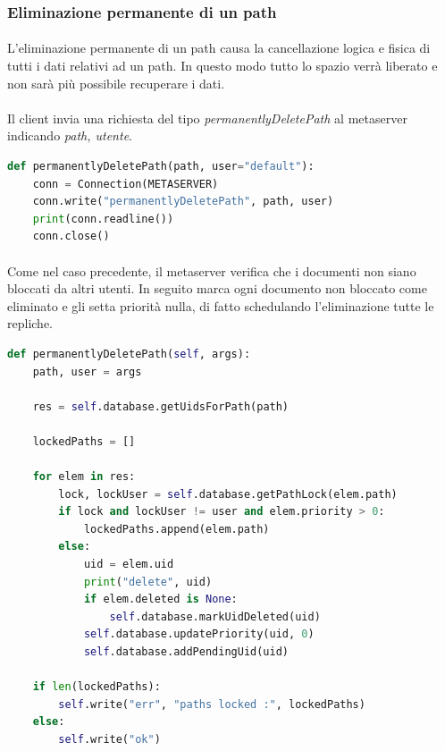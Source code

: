 \documentclass{article}
\begin{document}
\subsubsection{Eliminazione permanente di un path}

\paragraph{} L'eliminazione permanente di un path causa la cancellazione logica e fisica di tutti i dati relativi ad un path. In questo modo tutto lo spazio verrà liberato e non sarà più possibile recuperare i dati. 

\paragraph{} Il client invia una richiesta del tipo \emph{permanentlyDeletePath} al metaserver indicando \emph{path, utente}.

\begin{lstlisting}[language=Python, title=Codice]
def permanentlyDeletePath(path, user="default"):
    conn = Connection(METASERVER)
    conn.write("permanentlyDeletePath", path, user)
    print(conn.readline())
    conn.close()
\end{lstlisting}

\paragraph{} Come nel caso precedente, il metaserver verifica che i documenti non siano bloccati da altri utenti. In seguito marca ogni documento non bloccato come eliminato e gli setta priorità nulla, di fatto schedulando l'eliminazione tutte le repliche.

\begin{lstlisting}[language=Python, title=Codice]
def permanentlyDeletePath(self, args):
    path, user = args

    res = self.database.getUidsForPath(path)

    lockedPaths = []

    for elem in res:
        lock, lockUser = self.database.getPathLock(elem.path)
        if lock and lockUser != user and elem.priority > 0:
            lockedPaths.append(elem.path)
        else:
            uid = elem.uid
            print("delete", uid)
            if elem.deleted is None:
                self.database.markUidDeleted(uid)
            self.database.updatePriority(uid, 0)
            self.database.addPendingUid(uid)

    if len(lockedPaths):
        self.write("err", "paths locked :", lockedPaths)
    else:
        self.write("ok")
\end{lstlisting}
\end{document}
